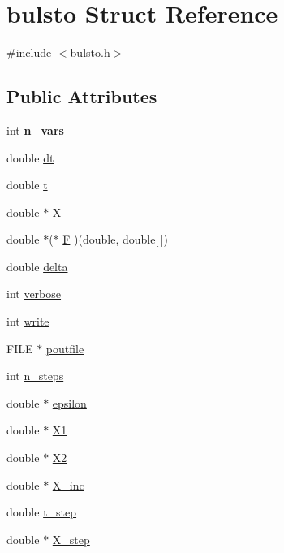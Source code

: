 \hypertarget{structbulsto}{}\section{bulsto Struct Reference}
\label{structbulsto}


{\ttfamily \#include $<$bulsto.\+h$>$}

\subsection*{Public Attributes}
\begin{DoxyCompactItemize}
\item 
\hypertarget{structbulsto_a4644ac965956cf8a34a102aa42882fa9}{}int {\bfseries n\+\_\+vars}\label{structbulsto_a4644ac965956cf8a34a102aa42882fa9}

\item 
double \hyperlink{structbulsto_a36056008e687384ae776b011c92a8536}{dt}
\item 
double \hyperlink{structbulsto_a3553c5b225bd39d4f8e797ea958f8b3b}{t}
\item 
double $\ast$ \hyperlink{structbulsto_a110de2f76d66addd0c11b3c1cf896557}{X}
\item 
double $\ast$($\ast$ \hyperlink{structbulsto_a8b6f5733863e9f0ce2179bc45a58902b}{F} )(double, double\mbox{[}$\,$\mbox{]})
\item 
double \hyperlink{structbulsto_a88b2a30854139fc04fd3763f78c1d97d}{delta}
\item 
int \hyperlink{structbulsto_a21e52ecfd0e77ee341ec29e73e871be7}{verbose}
\item 
int \hyperlink{structbulsto_a79adff2fa017d5b62e46beebf5af387f}{write}
\item 
F\+I\+L\+E $\ast$ \hyperlink{structbulsto_a1bd09226c3efbaec4baa7915682b9c40}{poutfile}
\item 
int \hyperlink{structbulsto_ab0f98110059509f36682188917a94e82}{n\+\_\+steps}
\item 
double $\ast$ \hyperlink{structbulsto_a5b4eb1332886f1695feea32c643a9068}{epsilon}
\item 
double $\ast$ \hyperlink{structbulsto_ae042d246b8cc4fc2dca7eeb2b7de41a0}{X1}
\item 
double $\ast$ \hyperlink{structbulsto_a07d3f69a611b1f3d346615d8936672ce}{X2}
\item 
double $\ast$ \hyperlink{structbulsto_ad3ed4caf9c6fac621f0712b5162c0948}{X\+\_\+inc}
\item 
double \hyperlink{structbulsto_aa8ddc55838fa4eef090464cd6c523b1b}{t\+\_\+step}
\item 
double $\ast$ \hyperlink{structbulsto_abda965d700144ad6697fb51a52c15d19}{X\+\_\+step}
\end{DoxyCompactItemize}



